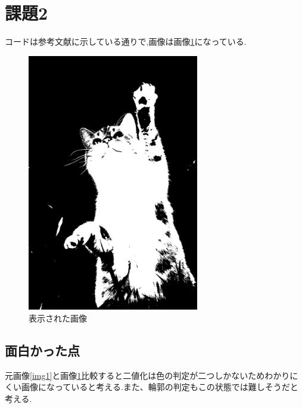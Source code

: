 \documentclass[a4paper, 11pt]{jsarticle}
\begin{document}
\section{課題2}
コードは参考文献\cite{two}に示している通りで,画像は画像\ref{img4}になっている.
\begin{figure}[htbp]
  \begin{center}
    \includegraphics[width=75mm]{lena_binary.jpg}
    \caption{表示された画像}
    \label{img4}
  \end{center}
\end{figure}
\subsection{面白かった点}
元画像\ref{img1}と画像\ref{img4}比較すると二値化は色の判定が二つしかないためわかりにくい画像になっていると考える.また、輪郭の判定もこの状態では難しそうだと考える.
\end{document}
